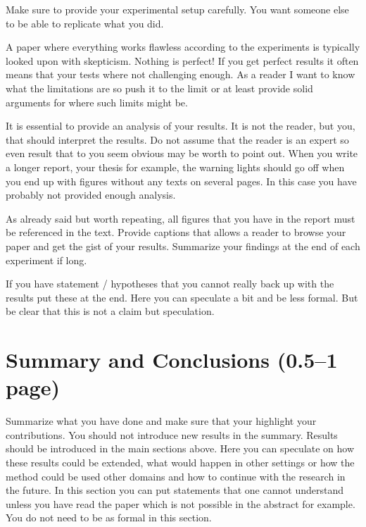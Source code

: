 \documentclass[a4paper,12pt]{article}
\begin{document}
Make sure to provide your experimental setup carefully. You want
someone else to be able to replicate what you did.

A paper where everything works flawless according to the experiments
is typically looked upon with skepticism. Nothing is perfect! If you
get perfect results it often means that your tests where not
challenging enough. As a reader I want to know what the limitations
are so push it to the limit or at least provide solid arguments for
where such limits might be.

It is essential to provide an analysis of your results. It is not the
reader, but you, that should interpret the results. Do not assume that
the reader is an expert so even result that to you seem obvious may be
worth to point out. When you write a longer report, your thesis for
example, the warning lights should go off when you end up with figures
without any texts on several pages. In this case you have probably not
provided enough analysis.

As already said but worth repeating, all figures that you have in the
report must be referenced in the text. Provide captions that allows a
reader to browse your paper and get the gist of your
results. Summarize your findings at the end of each experiment if
long.

If you have statement / hypotheses that you cannot really back up with
the results put these at the end. Here you can speculate a bit and be
less formal.  But be clear that this is not a claim but speculation.

\section{Summary and Conclusions (0.5--1 page)}
\label{sec:summary}

Summarize what you have done and make sure that your highlight your
contributions. You should not introduce new results in the
summary. Results should be introduced in the main sections above. Here
you can speculate on how these results could be extended, what would
happen in other settings or how the method could be used other domains
and how to continue with the research in the future. In this section
you can put statements that one cannot understand unless you have read
the paper which is not possible in the abstract for example. You do
not need to be as formal in this section.





\end{document}
